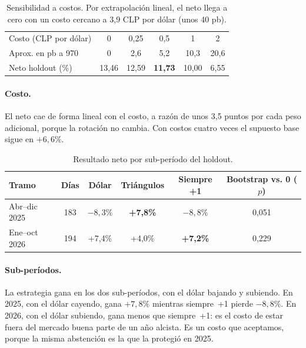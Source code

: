 \documentclass[10pt,a4paper]{article}
\begin{document}
\begin{table}[htbp]\centering\small
\begin{tabular}{@{}lccccc@{}}
\toprule
Costo (CLP por dólar) & 0 & 0{,}25 & 0{,}5 & 1 & 2 \\
Aprox. en pb a 970 & 0 & 2,6 & 5,2 & 10,3 & 20,6 \\
\midrule
Neto holdout (\%) & 13{,}46 & 12{,}59 & \textbf{11{,}73} & 10{,}00 & 6{,}55 \\
\bottomrule
\end{tabular}
\caption{Sensibilidad a costos. Por extrapolación lineal, el neto llega a cero con
un costo cercano a 3,9 CLP por dólar (unos 40 pb).}\label{tab:costos}
\end{table}

\paragraph{Costo.} El neto cae de forma lineal con el costo, a razón de unos 3,5
puntos por cada peso adicional, porque la rotación no cambia. Con costos cuatro
veces el supuesto base sigue en $+6{,}6\%$.

\begin{table}[htbp]\centering\small
\begin{tabular}{@{}lccccc@{}}
\toprule
Tramo & Días & Dólar & Triángulos & Siempre +1 & Bootstrap vs. 0 ($p$) \\
\midrule
Abr--dic 2025 & 183 & $-8{,}3\%$ & \textbf{+7{,}8\%} & $-8{,}8\%$ & 0{,}051 \\
Ene--oct 2026 & 194 & +7{,}4\%   & +4{,}0\% & \textbf{+7{,}2\%} & 0{,}229 \\
\bottomrule
\end{tabular}
\caption{Resultado neto por sub-período del holdout.}\label{tab:subperiodos}
\end{table}

\paragraph{Sub-períodos.} La estrategia gana en los dos sub-períodos, con el dólar
bajando y subiendo. En 2025, con el dólar cayendo, gana $+7{,}8\%$ mientras
siempre~+1 pierde $-8{,}8\%$. En 2026, con el dólar subiendo, gana menos que
siempre~+1: es el costo de estar fuera del mercado buena parte de un año alcista.
Es un costo que aceptamos, porque la misma abstención es la que la protegió en 2025.
\end{document}
